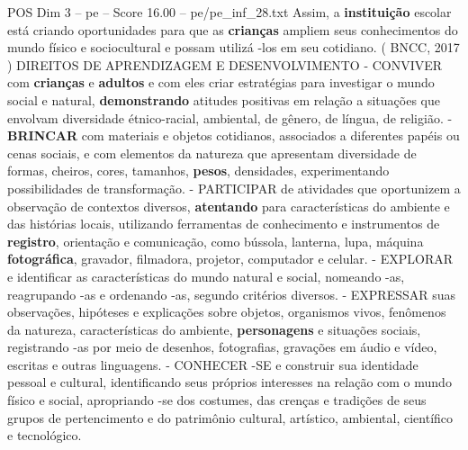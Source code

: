 \begin{textsample}{POS Dim 3 – pe – Score 16.00 – pe/pe\_inf\_28.txt}
Assim, a \textbf{instituição} escolar está criando oportunidades para que as \textbf{crianças} ampliem seus conhecimentos do mundo físico e sociocultural e possam utilizá -los em seu cotidiano. ( BNCC, 2017 ) DIREITOS DE APRENDIZAGEM E DESENVOLVIMENTO - CONVIVER com \textbf{crianças} e \textbf{adultos} e com eles criar estratégias para investigar o mundo social e natural, \textbf{demonstrando} atitudes positivas em relação a situações que envolvam diversidade étnico-racial, ambiental, de gênero, de língua, de religião. - \textbf{BRINCAR} com materiais e objetos cotidianos, associados a diferentes papéis ou cenas sociais, e com elementos da natureza que apresentam diversidade de formas, cheiros, cores, tamanhos, \textbf{pesos}, densidades, experimentando possibilidades de transformação. - PARTICIPAR de atividades que oportunizem a observação de contextos diversos, \textbf{atentando} para características do ambiente e das histórias locais, utilizando ferramentas de conhecimento e instrumentos de \textbf{registro}, orientação e comunicação, como bússola, lanterna, lupa, máquina \textbf{fotográfica}, gravador, filmadora, projetor, computador e celular. - EXPLORAR e identificar as características do mundo natural e social, nomeando -as, reagrupando -as e ordenando -as, segundo critérios diversos. - EXPRESSAR suas observações, hipóteses e explicações sobre objetos, organismos vivos, fenômenos da natureza, características do ambiente, \textbf{personagens} e situações sociais, registrando -as por meio de desenhos, fotografias, gravações em áudio e vídeo, escritas e outras linguagens. - CONHECER -SE e construir sua identidade pessoal e cultural, identificando seus próprios interesses na relação com o mundo físico e social, apropriando -se dos costumes, das crenças e tradições de seus grupos de pertencimento e do patrimônio cultural, artístico, ambiental, científico e tecnológico.

\end{textsample}
